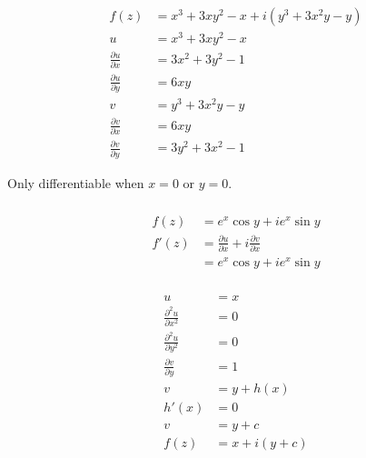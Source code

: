 \documentclass{article}
\begin{document}
\begin{align*}
  f(z)                          & = x^3 + 3 x y^2 - x + i (y^3 + 3 x^2 y - y) \\
  u                             & = x^3 + 3 x y^2 - x                         \\
  \frac{\partial u}{\partial x} & = 3 x^2 + 3 y^2 - 1                         \\
  \frac{\partial u}{\partial y} & = 6 x y                                     \\
  v                             & = y^3 + 3 x^2 y - y                         \\
  \frac{\partial v}{\partial x} & = 6 x y                                     \\
  \frac{\partial v}{\partial y} & = 3 y^2 + 3 x^2 - 1
\end{align*}

Only differentiable when $x = 0$ or $y = 0$.

\setcounter{subsubsection}{20}
\subsubsection{}

\begin{align*}
  f(z)  & = e^x \cos y + i e^x \sin y                                       \\
  f'(z) & = \frac{\partial u}{\partial x} + i \frac{\partial v}{\partial x} \\
        & = e^x \cos y + i e^x \sin y
\end{align*}

\setcounter{subsubsection}{22}
\subsubsection{}

\begin{align*}
  u                                 & = x             \\
  \frac{\partial^2 u}{\partial x^2} & = 0             \\
  \frac{\partial^2 u}{\partial y^2} & = 0             \\
  \frac{\partial v}{\partial y}     & = 1             \\
  v                                 & = y + h(x)      \\
  h'(x)                             & = 0             \\
  v                                 & = y + c         \\
  f(z)                              & = x + i (y + c)
\end{align*}
\end{document}
